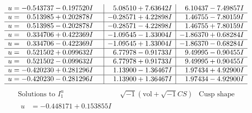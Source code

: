 \documentclass[1p]{elsarticle_modified}
\theoremstyle{definition}
\newcommand{\I}{\sqrt{-1}}
\begin{document}
$$\begin{array}{c|c|c}
\begin{aligned}
u &= -0.543737 - 0.197520 I\end{aligned}
 & \phantom{-}5.08510 + 7.63642 I & \phantom{-}6.10437 - 7.49857 I \\ \hline\begin{aligned}
u &= \phantom{-}0.513985 + 0.202878 I\end{aligned}
 & -0.28571 + 4.22898 I & \phantom{-}1.46755 - 7.80159 I \\ \hline\begin{aligned}
u &= \phantom{-}0.513985 - 0.202878 I\end{aligned}
 & -0.28571 - 4.22898 I & \phantom{-}1.46755 + 7.80159 I \\ \hline\begin{aligned}
u &= \phantom{-}0.334706 + 0.422369 I\end{aligned}
 & -1.09545 - 1.33004 I & -1.86370 + 0.68284 I \\ \hline\begin{aligned}
u &= \phantom{-}0.334706 - 0.422369 I\end{aligned}
 & -1.09545 + 1.33004 I & -1.86370 - 0.68284 I \\ \hline\begin{aligned}
u &= \phantom{-}0.521502 + 0.099632 I\end{aligned}
 & \phantom{-}6.77978 - 0.91733 I & \phantom{-}9.49995 - 0.90455 I \\ \hline\begin{aligned}
u &= \phantom{-}0.521502 - 0.099632 I\end{aligned}
 & \phantom{-}6.77978 + 0.91733 I & \phantom{-}9.49995 + 0.90455 I \\ \hline\begin{aligned}
u &= -0.420230 + 0.281296 I\end{aligned}
 & \phantom{-}1.13900 - 1.36467 I & \phantom{-}1.97434 + 4.92900 I \\ \hline\begin{aligned}
u &= -0.420230 - 0.281296 I\end{aligned}
 & \phantom{-}1.13900 + 1.36467 I & \phantom{-}1.97434 - 4.92900 I\\
 \hline 
 \end{array}$$\newpage$$\begin{array}{c|c|c}  
\text{Solutions to }I^u_{1}& \I (\text{vol} + \sqrt{-1}CS) & \text{Cusp shape}\\
 \hline 
\begin{aligned}
u &= -0.448171 + 0.153855 I\end{aligned}

\end{array}$$
\end{document}

